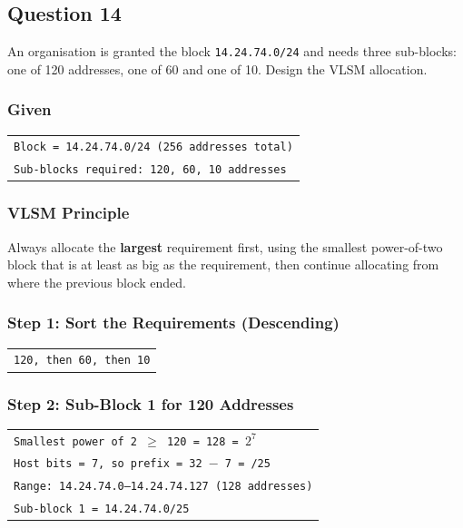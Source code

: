 \documentclass[11pt,a4paper]{article}
\begin{document}
\subsection*{Question 14}

An organisation is granted the block \texttt{14.24.74.0/24} and needs three sub-blocks: one of
120 addresses, one of 60 and one of 10. Design the VLSM allocation.

\subsubsection*{Given}

\begin{tabularx}{\textwidth}{@{}X@{}}
\texttt{Block = 14.24.74.0/24 (256 addresses total)} \\
\texttt{Sub-blocks required: 120, 60, 10 addresses} \\
\end{tabularx}

\subsubsection*{VLSM Principle}

Always allocate the \textbf{largest} requirement first, using the smallest
power-of-two block that is at least as big as the requirement, then continue
allocating from where the previous block ended.

\subsubsection*{Step 1: Sort the Requirements (Descending)}

\begin{tabularx}{\textwidth}{@{}X@{}}
\texttt{120, then 60, then 10} \\
\end{tabularx}

\subsubsection*{Step 2: Sub-Block 1 for 120 Addresses}

\begin{tabularx}{\textwidth}{@{}X@{}}
\texttt{Smallest power of 2 $\ge$ 120 = 128 = $2^{7}$} \\
\texttt{Host bits = 7, so prefix = 32 $-$ 7 = /25} \\
\texttt{Range: 14.24.74.0--14.24.74.127 (128 addresses)} \\
\texttt{Sub-block 1 = 14.24.74.0/25} \\
\end{tabularx}
\end{document}
